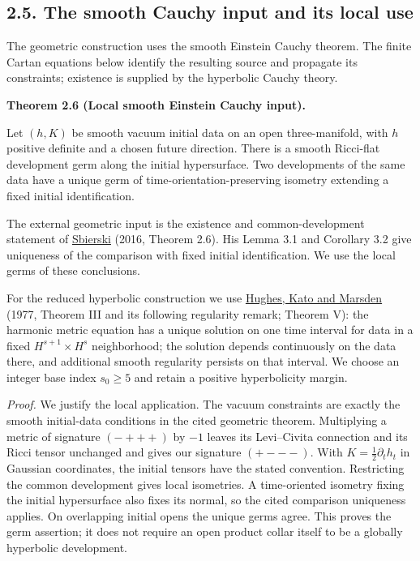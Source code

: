 \documentclass[
  english,
  11pt,
  reqno]{amsart}
\makeatletter
\newcommand{\pandocstatementheading}[1]{%
  \par\if@nobreak\else
    \addpenalty{\@beginparpenalty}%
    \addvspace{.5\baselineskip plus .2\baselineskip minus .2\baselineskip}%
  \fi
  {\normalfont\bfseries #1\par}%
  \nobreak\@afterindenttrue\@afterheading
}
\makeatother
\begin{document}
\subsection{2.5. The smooth Cauchy input and its local
use}\label{the-smooth-cauchy-input-and-its-local-use}\label{sec:online-smooth-cauchy-input}

The geometric construction uses the smooth Einstein Cauchy theorem. The
finite Cartan equations below identify the resulting source and
propagate its constraints; existence is supplied by the hyperbolic
Cauchy theory.

\pandocstatementheading{\leavevmode{}\label{thm:online-smooth-local-cauchy-input}Theorem 2.6 (Local smooth Einstein Cauchy input).}

Let \((h,K)\) be smooth vacuum initial data on an open three-manifold,
with \(h\) positive definite and a chosen future direction. There is a
smooth Ricci-flat development germ along the initial hypersurface. Two
developments of the same data have a unique germ of
time-orientation-preserving isometry extending a fixed initial
identification.

The external geometric input is the existence and common-development
statement of \hyperref[ref-Sbierski2016]{Sbierski} (2016, Theorem 2.6).
His Lemma 3.1 and Corollary 3.2 give uniqueness of the comparison with
fixed initial identification. We use the local germs of these
conclusions.

For the reduced hyperbolic construction we use
\hyperref[ref-HughesKatoMarsden1977]{Hughes, Kato and Marsden} (1977,
Theorem III and its following regularity remark; Theorem V): the
harmonic metric equation has a unique solution on one time interval for
data in a fixed \(H^{s+1}\times H^s\) neighborhood; the solution depends
continuously on the data there, and additional smooth regularity
persists on that interval. We choose an integer base index \(s_0\ge5\)
and retain a positive hyperbolicity margin.

\emph{Proof.} We justify the local application. The vacuum constraints
are exactly the smooth initial-data conditions in the cited geometric
theorem. Multiplying a metric of signature \((-+++)\) by \(-1\) leaves
its Levi--Civita connection and its Ricci tensor unchanged and gives our
signature \((+---)\). With \(K=\frac12\partial_t h_t\) in Gaussian
coordinates, the initial tensors have the stated convention. Restricting
the common development gives local isometries. A time-oriented isometry
fixing the initial hypersurface also fixes its normal, so the cited
comparison uniqueness applies. On overlapping initial opens the unique
germs agree. This proves the germ assertion; it does not require an open
product collar itself to be a globally hyperbolic development.
\end{document}
